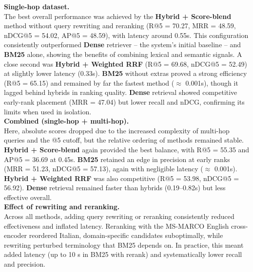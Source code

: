 \begin{spacing}{1.5}
\noindent \textbf{Single-hop dataset.}\\
The best overall performance was achieved by the \textbf{Hybrid + Score-blend} method without query rewriting and reranking (R@5 = 70.27, MRR = 48.59, nDCG@5 = 54.02, AP@5 = 48.59), with latency around 0.55s. This configuration consistently outperformed \textbf{Dense} retriever -- the system’s initial baseline -- and \textbf{BM25} alone, showing the benefits of combining lexical and semantic signals. A close second was \textbf{Hybrid + Weighted RRF} (R@5 = 69.68, nDCG@5 = 52.49) at slightly lower latency (0.33s).
\textbf{BM25} without extras proved a strong efficiency (R@5 = 65.15) and remained by far the fastest method ($\approx$ 0.001s), though it lagged behind hybrids in ranking quality. \textbf{Dense} retrieval showed competitive early-rank placement (MRR = 47.04) but lower recall and nDCG, confirming its limits when used in isolation.\\

\noindent \textbf{Combined (single-hop + multi-hop).}\\
Here, absolute scores dropped due to the increased complexity of multi-hop queries and the @5 cutoff, but the relative ordering of methods remained stable. \textbf{Hybrid + Score-blend} again provided the best balance, with R@5 = 55.35 and AP@5 = 36.69 at 0.45s. \textbf{BM25} retained an edge in precision at early ranks (MRR = 51.23, nDCG@5 = 57.13), again with negligible latency ($\approx$ 0.001s). \textbf{Hybrid + Weighted RRF} was also competitive (R@5 = 53.98, nDCG@5 = 56.92). \textbf{Dense} retrieval remained faster than hybrids (0.19--0.82s) but less effective overall.\\

\noindent \textbf{Effect of rewriting and reranking.}\\
Across all methods, adding query rewriting or reranking consistently reduced effectiveness and inflated latency. Reranking with the MS-MARCO English cross-encoder reordered Italian, domain-specific candidates suboptimally, while rewriting perturbed terminology that BM25 depends on. In practice, this meant added latency (up to 10 s in BM25 with rerank) and systematically lower recall and precision.\\


\end{spacing}
